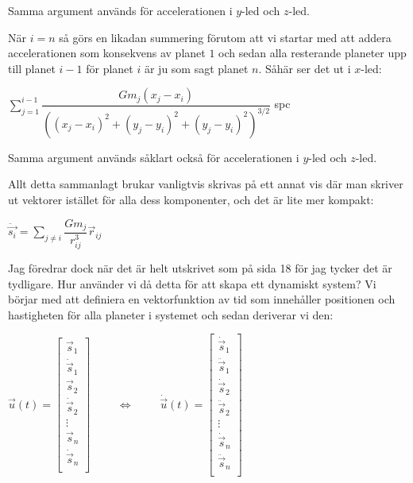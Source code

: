 \documentclass[10pt, a4paper]{amsart}
\begin{document}
Samma argument används för accelerationen i $ y $-led och $ z $-led.
\bigskip

När $ i = n $ så görs en likadan summering förutom att vi startar med att addera accelerationen som konsekvens av planet $ 1 $ och sedan alla resterande planeter upp till planet $ i - 1 $ för planet $ i $ är ju som sagt planet $ n $.
Såhär ser det ut i $ x $-led:
\bigskip

\bigskip
\hspace{5ex}
$ \sum\limits_{j=1}^{i - 1} \dfrac{Gm_j(x_j - x_i)}{((x_j - x_i)^2+(y_j - y_i)^2+(y_j - y_i)^2)^{3/2}} $
\vspace{24pt plus 4pt minus 4pt}
spc

Samma argument används såklart också för accelerationen i $ y $-led och $ z $-led.
\bigskip

Allt detta sammanlagt brukar vanligtvis skrivas på ett annat vis där man skriver ut vektorer istället för alla dess komponenter, och det är lite mer kompakt:
\bigskip

\bigskip
\hspace{5ex}
$ \ddot \vec{s_{i}} = \sum\limits_{j \neq i}^{} \dfrac{Gm_j}{r_{ij}^3}\vec r_{ij} $
\vspace{24pt plus 4pt minus 4pt}

Jag föredrar dock när det är helt utskrivet som på sida 18 för jag tycker det är tydligare.
Hur använder vi då detta för att skapa ett dynamiskt system?
Vi börjar med att definiera en vektorfunktion av tid som innehåller positionen och hastigheten för alla planeter i systemet och sedan deriverar vi den:
\bigskip

\bigskip
\hspace{5ex}
$ \vec{u}(t) = 
    \begin{bmatrix}
        \vec s_1 \\
        \dot \vec s_1 \\
        \vec s_2 \\
        \dot \vec s_2 \\
        \vdots \\
        \vec s_n \\
        \dot \vec s_n \\
    \end{bmatrix}
$ 
$ \text{ } $
$ \text{ } $
$ \Leftrightarrow $
$ \text{ } $
$ \text{ } $
$ \dot \vec{u}(t) = 
    \begin{bmatrix}
        \dot \vec s_1 \\
        \ddot \vec s_1 \\
        \dot \vec s_2 \\
        \ddot \vec s_2 \\
        \vdots \\
        \dot \vec s_n \\
        \ddot \vec s_n \\
    \end{bmatrix}
$ 
\vspace{24pt plus 4pt minus 4pt}
\end{document}
